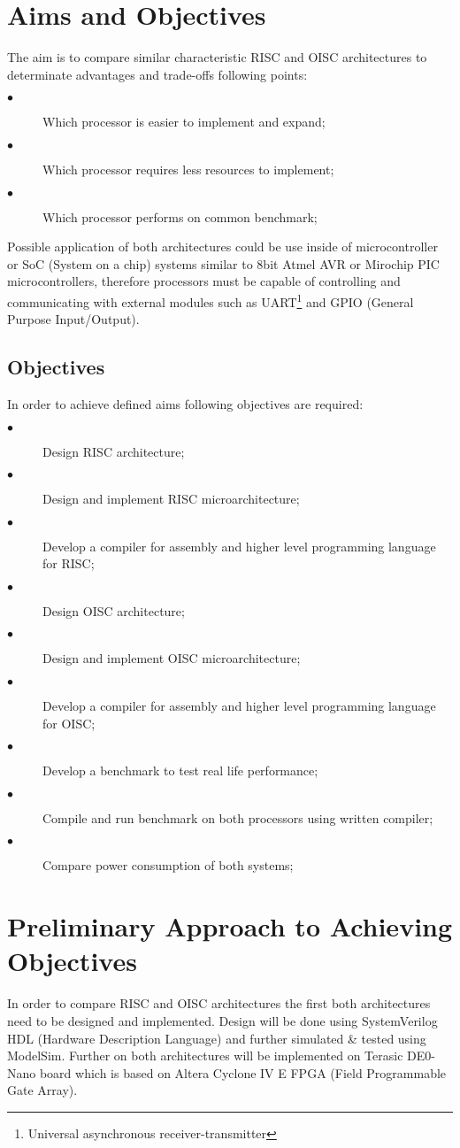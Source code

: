 \documentclass[a4paper,11pt]{article}
\begin{document}
\section{Aims and Objectives}
The aim is to compare similar characteristic RISC and OISC architectures to determinate advantages and trade-offs following points:
\begin{description}
	\item[$\bullet$] Which processor is easier to implement and expand;
	\item[$\bullet$] Which processor requires less resources to implement;
	\item[$\bullet$] Which processor performs on common benchmark;
\end{description}
Possible application of both architectures could be use inside of microcontroller or SoC (System on a chip) systems similar to 8bit Atmel AVR or Mirochip PIC microcontrollers, therefore processors must be capable of controlling and communicating with external modules such as UART\footnote{Universal asynchronous receiver-transmitter} and GPIO (General Purpose Input/Output).

\subsection{Objectives}
In order to achieve defined aims following objectives are required:
\begin{description}
	\item[$\bullet$] Design RISC architecture;
	\item[$\bullet$] Design and implement RISC microarchitecture;
	\item[$\bullet$] Develop a compiler for assembly and higher level programming language for RISC;
	\item[$\bullet$] Design OISC architecture;
	\item[$\bullet$] Design and implement OISC microarchitecture;
	\item[$\bullet$] Develop a compiler for assembly and higher level programming language for OISC;
	\item[$\bullet$] Develop a benchmark to test real life performance;
	\item[$\bullet$] Compile and run benchmark on both processors using written compiler;
	\item[$\bullet$] Compare power consumption of both systems;
\end{description}
\vfill

\pagebreak
\section{Preliminary Approach to Achieving Objectives}
In order to compare RISC and OISC architectures the first both architectures need to be designed and implemented. Design will be done using SystemVerilog HDL (Hardware Description Language) and further simulated \& tested using ModelSim. Further on both architectures will be implemented on Terasic DE0-Nano board which is based on Altera Cyclone IV E FPGA (Field Programmable Gate Array). 
\end{document}
